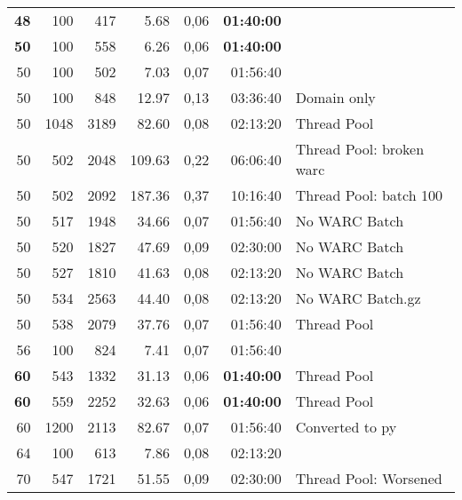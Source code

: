 \begin{table}[!ht]
\begin{tabular}{rrrrrrl}
    \textbf{48}  & 100          & 417          & 5.68         & 0,06         & \textbf{01:40:00} &                          \\
    \textbf{50}  & 100          & 558          & 6.26         & 0,06         & \textbf{01:40:00} &                          \\
    50           & 100          & 502          & 7.03         & 0,07         & 01:56:40          &                          \\
    50           & 100          & 848          & 12.97        & 0,13         & 03:36:40          & Domain only              \\
    50           & 1048         & 3189         & 82.60        & 0,08         & 02:13:20          & Thread Pool              \\
    50           & 502          & 2048         & 109.63       & 0,22         & 06:06:40          & Thread Pool: broken warc \\
    50           & 502          & 2092         & 187.36       & 0,37         & 10:16:40          & Thread Pool: batch 100   \\
    50           & 517          & 1948         & 34.66        & 0,07         & 01:56:40          & No WARC Batch            \\
    50           & 520          & 1827         & 47.69        & 0,09         & 02:30:00          & No WARC Batch            \\
    50           & 527          & 1810         & 41.63        & 0,08         & 02:13:20          & No WARC Batch            \\
    50           & 534          & 2563         & 44.40        & 0,08         & 02:13:20          & No WARC Batch.gz         \\
    50           & 538          & 2079         & 37.76        & 0,07         & 01:56:40          & Thread Pool              \\
    56           & 100          & 824          & 7.41         & 0,07         & 01:56:40          &                          \\
    \textbf{60}  & 543          & 1332         & 31.13        & 0,06         & \textbf{01:40:00} & Thread Pool              \\
    \textbf{60}  & 559          & 2252         & 32.63        & 0,06         & \textbf{01:40:00} & Thread Pool              \\
    60           & 1200         & 2113         & 82.67        & 0,07         & 01:56:40          & Converted to py          \\
    64           & 100          & 613          & 7.86         & 0,08         & 02:13:20          &                          \\
    70           & 547          & 1721         & 51.55        & 0,09         & 02:30:00          & Thread Pool: Worsened    \\
  \end{tabular}
\end{table}


